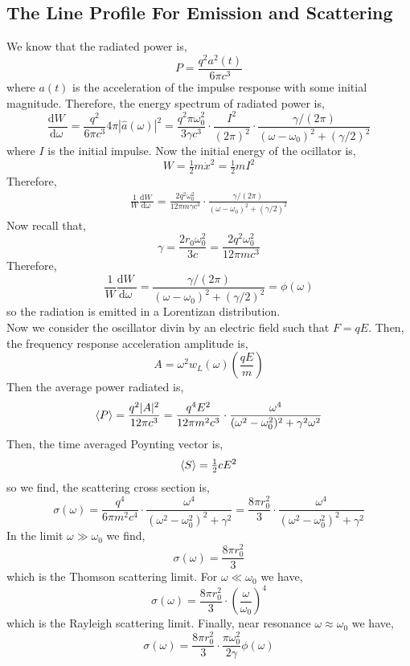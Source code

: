 \documentclass[12pt]{extarticle}
\renewcommand{\d}[1]{ \mathrm{d}#1 \:}
\newcommand{\deriv}[2]{\frac{\d{#1}}{\d{#2}}}
\theoremstyle{definition}
\begin{document}
\subsection{The Line Profile For Emission and Scattering}

We know that the radiated power is,
\[ P = \frac{q^2 a^2(t)}{6 \pi c^3} \]
where $a(t)$ is the acceleration of the impulse response with some initial magnitude.
Therefore, the energy spectrum of radiated power is,
\[ \deriv{W}{\omega} = \frac{q^2}{6 \pi c^3} 4 \pi |\hat{a}(\omega)|^2 = \frac{q^2 \pi \omega_0^2}{3 \gamma c^3} \cdot \frac{I^2}{(2 \pi)^2} \cdot \frac{\gamma / (2 \pi)}{(\omega - \omega_0)^2 + \left( \gamma / 2 \right)^2} \]
where $I$ is the initial impulse. 
Now the initial energy of the ocillator is,
\[ W = \tfrac{1}{2} m \dot{x}^2 = \tfrac{1}{2} m I^2 \]
Therefore,
\begin{align*}
\frac{1}{W} \deriv{W}{\omega} = \frac{2 q^2 \omega_0^2}{12 \pi m \gamma c^3} \cdot \frac{\gamma / (2 \pi)}{(\omega - \omega_0)^2 + \left( \gamma / 2 \right)^2}
\end{align*}
Now recall that,
\[ \gamma = \frac{2 r_0 \omega_0^2}{3 c} = \frac{2 q^2 \omega_0^2}{12 \pi m c^3} \]
Therefore,
\[ \frac{1}{W} \deriv{W}{\omega} = \frac{\gamma / (2 \pi)}{(\omega - \omega_0)^2 + \left( \gamma / 2 \right)^2} = \phi(\omega) \]
so the radiation is emitted in a Lorentizan distribution. 
\bigskip\\
Now we consider the oscillator divin by an electric field such that $F = qE$. Then, the frequency response acceleration amplitude is,
\[ A = \omega^2 w_L(\omega) \left( \frac{q E}{m} \right) \]
Then the average power radiated is,
\[ \left< P \right> = \frac{q^2 |A|^2}{12 \pi c^3} = \frac{q^4 E^2}{12 \pi m^2 c^3} \cdot \frac{\omega^4}{(\omega^2 - \omega_0^2)^2 + \gamma^2 \omega^2} \]
Then, the time averaged Poynting vector is,
\[ \left< S \right> = \tfrac{1}{2} c E^2 \]
so we find, the scattering cross section is,
\[ \sigma(\omega) = \frac{q^4}{6 \pi m^2 c^4} \cdot \frac{\omega^4}{(\omega^2 - \omega_0^2)^2 + \gamma^2} = \frac{8 \pi r_0^2}{3} \cdot \frac{\omega^4}{(\omega^2 - \omega_0^2)^2 + \gamma^2} \]
In the limit $\omega \gg \omega_0$ we find,
\[ \sigma(\omega) = \frac{8 \pi r_0^2}{3} \]
which is the Thomson scattering limit. For $\omega \ll \omega_0$ we have,
\[ \sigma(\omega) = \frac{8 \pi r_0^2}{3} \cdot \left( \frac{\omega}{\omega_0} \right)^4 \]
which is the Rayleigh scattering limit. Finally, near resonance $\omega \approx \omega_0$ we have,
\[ \sigma(\omega) = \frac{8 \pi r_0^2}{3} \cdot \frac{\pi \omega_0^2}{2 \gamma} \phi(\omega) \]
\end{document}
